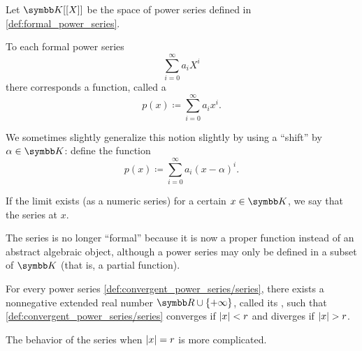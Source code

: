 \begin{definition}\label{def:convergent_power_series}
  Let \( \K[[X]] \) be the space of power series defined in \cref{def:formal_power_series}.

  To each formal power series
  \begin{equation*}
    \sum_{i=0}^\infty a_i X^i
  \end{equation*}
  there corresponds a function, called a 
  \begin{equation}\label{def:convergent_power_series/series}
    p(x) \coloneqq \sum_{i=0}^\infty a_i x^i.
  \end{equation}

  We sometimes slightly generalize this notion slightly by using a \enquote{shift} by \( \alpha \in \K \): define the function
  \begin{equation}\label{def:convergent_power_series/shifted_series}
    p(x) \coloneqq \sum_{i=0}^\infty a_i (x - \alpha)^i.
  \end{equation}

  If the limit exists (as a numeric series) for a certain \( x \in \K \), we say that the series  at \( x \).

  The series is no longer \enquote{formal} because it is now a proper function instead of an abstract algebraic object, although a power series may only be defined in a subset of \( \K \) (that is, a partial function).
\end{definition}

\begin{theorem}\label{thm:power_series_radius_of_convergence}
  For every power series \cref{def:convergent_power_series/series}, there exists a nonnegative extended real number \( \R \cup \{ +\infty \} \), called its , such that \cref{def:convergent_power_series/series} converges if \( \left\vert x \right\vert < r \) and diverges if \( \left\vert x \right\vert > r \).

  The behavior of the series when \( \left\vert x \right\vert = r \) is more complicated.
\end{theorem}
